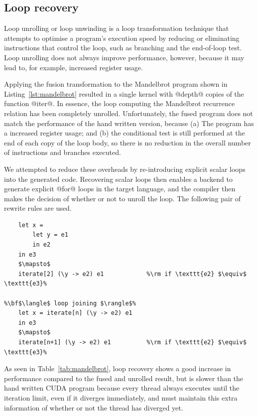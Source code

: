 \subsection{Loop recovery}

Loop unrolling or loop unwinding is a loop transformation technique that
attempts to optimise a program's execution speed by reducing or eliminating
instructions that control the loop, such as branching and the end-of-loop test.
Loop unrolling does not always improve performance, however, because it may lead
to, for example, increased register usage.

Applying the fusion transformation to the Mandelbrot program shown in
Listing~\ref{lst:mandelbrot} resulted in a single kernel with @depth@ copies of
the function @iter@. In essence, the loop computing the Mandelbrot recurrence
relation has been completely unrolled. Unfortunately, the fused program does not
match the performance of the hand written version, because (a)
The program has a increased register usage; and (b) the conditional test is
still performed at the end of each copy of the loop body, so there is no
reduction in the overall number of instructions and branches executed.

We attempted to reduce these overheads by re-introducing explicit scalar loops
into the generated code. Recovering scalar loops then enables a backend to
generate explicit @for@ loops in the target language, and the compiler then
makes the decision of whether or not to unroll the loop. The following pair of
rewrite rules are used.
%
\begin{lstlisting}[style=Haskell,numbers=none,mathescape]
%\bf$\langle$ loop introduction $\rangle$%
    let x =
        let y = e1
        in e2
    in e3
    $\mapsto$
    iterate[2] (\y -> e2) e1            %\rm if \texttt{e2} $\equiv$ \texttt{e3}%

%\bf$\langle$ loop joining $\rangle$%
    let x = iterate[n] (\y -> e2) e1
    in e3
    $\mapsto$
    iterate[n+1] (\y -> e2) e1          %\rm if \texttt{e2} $\equiv$ \texttt{e3}%
\end{lstlisting}

As seen in Table~\ref{tab:mandelbrot}, loop recovery shows a good increase in
performance compared to the fused and unrolled result, but is slower than the
hand written CUDA program because every thread always executes until the
iteration limit, even if it diverges immediately, and must maintain this extra
information of whether or not the thread has diverged yet.


